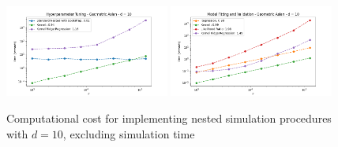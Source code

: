\begin{figure}[ht!]
    \centering
    \includegraphics[width=0.48\textwidth]{./project1/figures/figure12a.png}
    \includegraphics[width=0.48\textwidth]{./project1/figures/figure12b.png}
    \caption{Computational cost for implementing nested simulation procedures with $d=10$, excluding simulation time}
    \label{fig1:c_model}
\end{figure}

